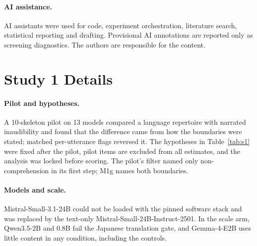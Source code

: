\documentclass[11pt]{article}
\begin{document}
\paragraph{AI assistance.} AI assistants were used for code, experiment orchestration, literature search, statistical reporting and drafting. Provisional AI annotations are reported only as screening diagnostics. The authors are responsible for the content.



\appendix
\section{Study 1 Details}
\label{app:s1}
\paragraph{Pilot and hypotheses.} A 10-skeleton pilot on 13 models compared a language repertoire with narrated inaudibility and found that the difference came from how the boundaries were stated; matched per-utterance flags reversed it. The hypotheses in Table~\ref{tab:s1} were fixed after the pilot, pilot items are excluded from all estimates, and the analysis was locked before scoring. The pilot's filter named only non-comprehension in its first step; M1g names both boundaries.

\paragraph{Models and scale.} Mistral-Small-3.1-24B could not be loaded with the pinned software stack and was replaced by the text-only Mistral-Small-24B-Instruct-2501. In the scale arm, Qwen3.5-2B and 0.8B fail the Japanese translation gate, and Gemma-4-E2B uses little content in any condition, including the controls.
\end{document}
